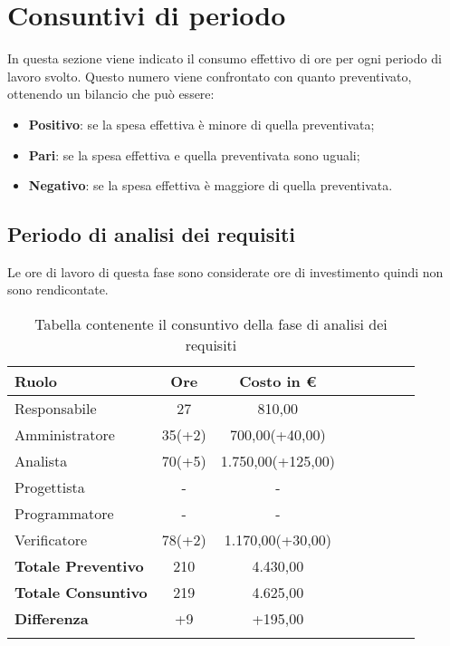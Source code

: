 \section{Consuntivi di periodo} \label{_consuntivo}
In questa sezione viene indicato il consumo effettivo di ore per ogni periodo di lavoro svolto. Questo numero viene confrontato con quanto preventivato, ottenendo un bilancio che può essere:
\begin{itemize}
    \item \textbf{Positivo}: se la spesa effettiva è minore di quella preventivata;
    \item \textbf{Pari}: se la spesa effettiva e quella preventivata sono uguali;
    \item \textbf{Negativo}:  se la spesa effettiva è maggiore di quella preventivata.
\end{itemize}

\subsection{Periodo di analisi dei requisiti} \label{_consuntivoAnalisiDeiRequisiti}
Le ore di lavoro di questa fase sono considerate ore di investimento quindi non sono rendicontate.
            				
			\begin{longtable}{|l|c|c|c|c|c|c|c|}
				\hline
				\rowcolor{lighter-grayer}
				\textbf{Ruolo} & \textbf{Ore} & \textbf{Costo in €} \\
				\hline
				\endfirsthead
				
				\hline
				Responsabile & 27 & 810,00\\
				\hline
				\hline
				Amministratore & 35(+2) & 700,00(+40,00)\\
				\hline
				\hline
				Analista & 70(+5) & 1.750,00(+125,00)\\
				\hline
				\hline
				Progettista & - & -\\
				\hline
				\hline
				Programmatore & - & -\\
				\hline
				\hline
				Verificatore & 78(+2) & 1.170,00(+30,00)\\
				\hline
                \textbf{Totale Preventivo} & 210 & 4.430,00\\
                \hline
				\hline
                \textbf{Totale Consuntivo} & 219 & 4.625,00\\
                \hline
                \hline
                \textbf{Differenza} & +9 & +195,00\\
				\hline
				\rowcolor{white}
				\caption{Tabella contenente il consuntivo della fase di analisi dei requisiti}
			\end{longtable}
